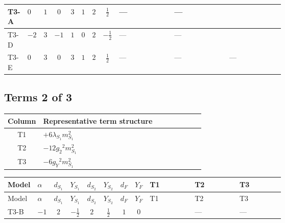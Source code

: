 \documentclass[8pt]{article}
\begin{document}
\begin{landscape}
\begin{longtable}{@{}llcccccc >{\raggedright\arraybackslash}p{0.21\linewidth} >{\raggedright\arraybackslash}p{0.21\linewidth} >{\raggedright\arraybackslash}p{0.21\linewidth}@{}}
\midrule
T3-A & $0$ & $1$ & $0$ & $3$ & $1$ & $2$ & $\frac{1}{2}$ & --- & --- & \scriptsize\adjustbox{max width=\linewidth}{$\begin{gathered} 6 {\lambda_{12}} {m_{S_2}^2}\end{gathered}$} \\
\midrule
T3-D & $-2$ & $3$ & $-1$ & $1$ & $0$ & $2$ & $-\frac{1}{2}$ & --- & --- & \scriptsize\adjustbox{max width=\linewidth}{$\begin{gathered} +2 {\lambda_{12}} {m_{S_2}^2}\end{gathered}$} \\
\midrule
T3-E & $0$ & $3$ & $0$ & $3$ & $1$ & $2$ & $\frac{1}{2}$ & --- & --- & --- \\
\midrule
\bottomrule
\end{longtable}
\clearpage
\subsection*{Terms 2 of 3}
\begin{center}
\begin{tabular}{@{}c >{\raggedright\arraybackslash}p{0.82\linewidth}@{}}
\toprule
Column & Representative term structure \\
\midrule
T1 & \(\displaystyle +6 {\lambda_{S_1}} {m_{S_1}^2}\) \\
\midrule
T2 & \(\displaystyle -12 {g_2}^2 {m_{S_1}^2}\) \\
\midrule
T3 & \(\displaystyle -6 {g_Y}^2 {m_{S_1}^2}\) \\
\midrule
\bottomrule
\end{tabular}
\end{center}
\smallskip
\tiny
\begin{longtable}{@{}llcccccc >{\raggedright\arraybackslash}p{0.21\linewidth} >{\raggedright\arraybackslash}p{0.21\linewidth} >{\raggedright\arraybackslash}p{0.21\linewidth}@{}}
\toprule
Model & $\alpha$ & $d_{S_1}$ & $Y_{S_1}$ & $d_{S_2}$ & $Y_{S_2}$ & $d_F$ & $Y_F$ & T1 & T2 & T3 \\
\midrule
\endfirsthead
\toprule
Model & $\alpha$ & $d_{S_1}$ & $Y_{S_1}$ & $d_{S_2}$ & $Y_{S_2}$ & $d_F$ & $Y_F$ & T1 & T2 & T3 \\
\midrule
\endhead
T3-B & $-1$ & $2$ & $-\frac{1}{2}$ & $2$ & $\frac{1}{2}$ & $1$ & $0$ & \scriptsize\adjustbox{max width=\linewidth}{$\begin{gathered} +6 {\lambda_{S_1}} {m_{S_1}^2}\end{gathered}$} & --- & --- \\

\end{longtable}
\end{landscape}
\end{document}
